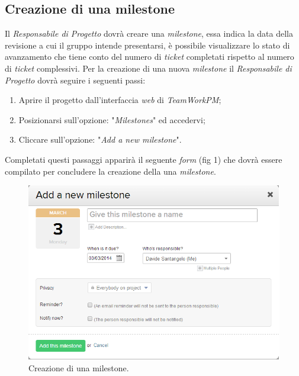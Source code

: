\subsection{Creazione di una milestone}
Il \textit{Responsabile di Progetto} dovrà creare una \textit{milestone}, essa indica la data della revisione a cui il gruppo \gruppo{} intende presentarsi, è possibile visualizzare lo stato di avanzamento che tiene conto del numero di \textit{ticket} completati rispetto al numero di \textit{ticket} complessivi.
Per la creazione di una nuova \textit{milestone} il \textit{Responsabile di Progetto} dovrà seguire i seguenti passi:
\begin{enumerate}
\item Aprire il progetto dall'interfaccia \textit{web} di \textit{TeamWorkPM};
\item Posizionarsi sull'opzione: "\emph{Milestones}" ed accedervi;
\item Cliccare sull'opzione: "\emph{Add a new milestone}".
\end{enumerate}

Completati questi passaggi apparirà il seguente \textit{form} (fig 1) che dovrà essere compilato per concludere la creazione della una \textit{milestone}.
\begin{figure}
\centering
\includegraphics[width=%
\textwidth]{immaginiNDP/Immagine}
\caption[]{Creazione di una milestone.}
\label{fig:Immagine}
\end{figure}

